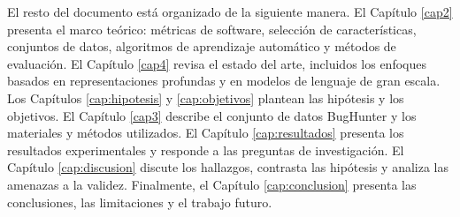 El resto del documento está organizado de la siguiente manera. El Capítulo \ref{cap2} presenta el marco teórico: métricas de software, selección de características, conjuntos de datos, algoritmos de aprendizaje automático y métodos de evaluación. El Capítulo \ref{cap4} revisa el estado del arte, incluidos los enfoques basados en representaciones profundas y en modelos de lenguaje de gran escala. Los Capítulos \ref{cap:hipotesis} y \ref{cap:objetivos} plantean las hipótesis y los objetivos. El Capítulo \ref{cap3} describe el conjunto de datos BugHunter y los materiales y métodos utilizados. El Capítulo \ref{cap:resultados} presenta los resultados experimentales y responde a las preguntas de investigación. El Capítulo \ref{cap:discusion} discute los hallazgos, contrasta las hipótesis y analiza las amenazas a la validez. Finalmente, el Capítulo \ref{cap:conclusion} presenta las conclusiones, las limitaciones y el trabajo futuro.

\newpage
